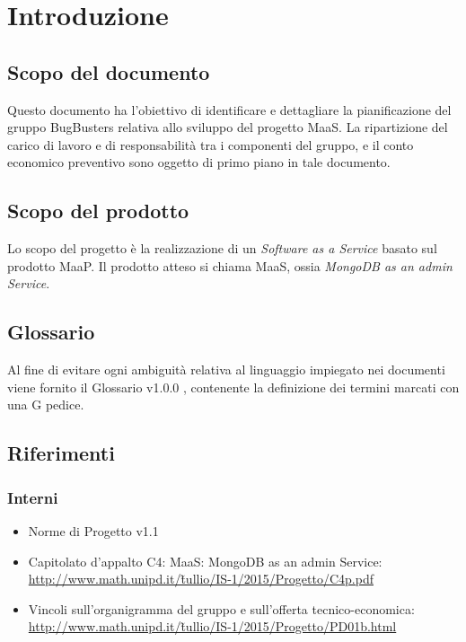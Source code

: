 \section{Introduzione}
\subsection{Scopo del documento}
Questo documento ha l’obiettivo di identificare e dettagliare la pianificazione del gruppo BugBusters
relativa allo sviluppo del progetto MaaS. La ripartizione del carico di lavoro e di responsabilit\`a tra i
componenti del gruppo, e il conto economico preventivo sono oggetto di primo piano in tale documento.

\subsection{Scopo del prodotto}
Lo scopo del progetto \`e la realizzazione di un \textit{Software as a Service} basato sul prodotto MaaP. Il prodotto atteso si chiama MaaS, ossia \textit{MongoDB as an admin Service}.

\subsection{Glossario}
Al fine di evitare ogni ambiguit\`a relativa al linguaggio impiegato nei documenti viene fornito il Glossario
v1.0.0 , contenente la definizione dei termini marcati con una G pedice.

\subsection{Riferimenti}
\subsubsection{Interni}
\begin{itemize}
\item Norme di Progetto v1.1
\item Capitolato d'appalto C4: MaaS: MongoDB as an admin Service: \\ \href{http://www.math.unipd.it/~tullio/IS-1/2015/Progetto/C4p.pdf}{http://www.math.unipd.it/\~tullio/IS-1/2015/Progetto/C4p.pdf} 
\item Vincoli sull’organigramma del gruppo e sull’offerta tecnico-economica: \\
\href{http://www.math.unipd.it/~tullio/IS-1/2015/Progetto/PD01b.html}{http://www.math.unipd.it/\~tullio/IS-1/2015/Progetto/PD01b.html}
\end{itemize}
